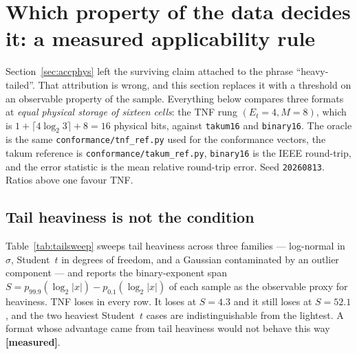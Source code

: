 \documentclass[11pt]{article}
\theoremstyle{definition}
\begin{document}
\section{Which property of the data decides it: a measured applicability
rule}\label{sec:window}

Section~\ref{sec:accphys} left the surviving claim attached to the phrase
``heavy-tailed''. That attribution is wrong, and this section replaces it with a
threshold on an observable property of the sample. Everything below compares three
formats at \emph{equal physical storage of sixteen cells}: the TNF rung
$(E_t{=}4,M{=}8)$, which is $1+\lceil 4\log_2 3\rceil+8=16$ physical bits, against
\texttt{takum16} and \texttt{binary16}. The oracle is the same
\texttt{conformance/tnf\_ref.py} used for the conformance vectors, the takum
reference is \texttt{conformance/takum\_ref.py}, \texttt{binary16} is the IEEE
round-trip, and the error statistic is the mean relative round-trip error. Seed
\texttt{20260813}. Ratios above one favour TNF.

\subsection{Tail heaviness is not the condition}

Table~\ref{tab:tailsweep} sweeps tail heaviness across three families --- log-normal
in $\sigma$, Student~$t$ in degrees of freedom, and a Gaussian contaminated by an
outlier component --- and reports the binary-exponent span
$S=p_{99.9}(\log_2|x|)-p_{0.1}(\log_2|x|)$ of each sample as the observable proxy
for heaviness. TNF loses in every row. It loses at $S=4.3$ and it still loses at
$S=52.1$, and the two heaviest Student~$t$ cases are indistinguishable from the
lightest. A format whose advantage came from tail heaviness would not behave this
way \textbf{[measured]}.
\end{document}

